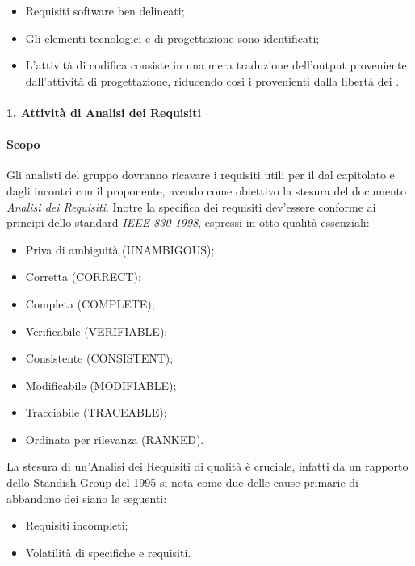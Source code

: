         \begin{itemize}
          \item Requisiti software ben delineati;
          \item Gli elementi tecnologici e di progettazione sono identificati;
          \item L'attivit\`a di codifica consiste in una mera traduzione dell'output proveniente dall'attivit\`a di progettazione,
            riducendo cos\`i i  provenienti dalla libert\`a dei .
        \end{itemize}
        
		\paragraph*{1. Attività di Analisi dei Requisiti}
			\paragraph*{Scopo}
				Gli analisti del gruppo dovranno ricavare i requisiti utili per il 
				dal capitolato e dagli incontri con il proponente, avendo come obiettivo la
				stesura del documento \textit{Analisi dei Requisiti}.
			        Inotre la specifica dei requisiti dev'essere conforme ai principi dello standard \textit{IEEE 830-1998}, espressi in otto qualit\`a
			        essenziali:
				\begin{itemize}
				\item Priva di ambiguit\`a (UNAMBIGOUS);
				\item Corretta (CORRECT);
				\item Completa (COMPLETE);
				\item Verificabile (VERIFIABLE);
				\item Consistente (CONSISTENT);
				\item Modificabile (MODIFIABLE);
				\item Tracciabile (TRACEABLE);
				\item Ordinata per rilevanza (RANKED).
				\end{itemize}
			        La stesura di un'Analisi dei Requisiti di qualit\`a \`e cruciale, infatti
			        da un rapporto dello Standish Group del 1995 si nota come due delle cause primarie
			        di abbandono dei  siano le seguenti:
				\begin{itemize}
				\item Requisiti incompleti;
				\item Volatilità di specifiche e requisiti.
				\end{itemize}
			

